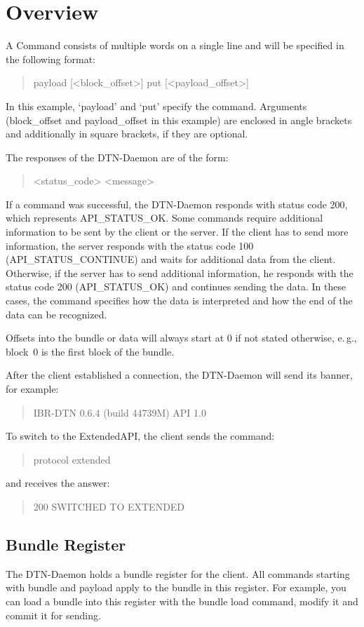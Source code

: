 \documentclass[12pt, a4paper]{scrartcl}
\begin{document}

\section{Overview}
A Command consists of multiple words on a single line and will be specified in the following format:
\begin{quote}
	payload [<block\_offset>] put [<payload\_offset>]
\end{quote}
In this example, `payload' and `put' specify the command.
Arguments (block\_offset and payload\_offset in this example) are enclosed in angle brackets and additionally in square brackets, if they are optional.

The responses of the DTN-Daemon are of the form:
\begin{quote}
	<status\_code> <message>
\end{quote}

If a command was successful, the DTN-Daemon responds with status code 200, which represents API\_STATUS\_OK.
Some commands require additional information to be sent by the client or the server.
If the client has to send more information, the server responds with the status code 100 (API\_STATUS\_CONTINUE) and waits for additional data from the client.
Otherwise, if the server has to send additional information, he responds with the status code 200 (API\_STATUS\_OK) and continues sending the data.
In these cases, the command specifies how the data is interpreted and how the end of the data can be recognized.

Offsets into the bundle or data will always start at 0 if not stated otherwise, e.\,g., block~0 is the first block of the bundle.

After the client established a connection, the DTN-Daemon will send its banner, for example:
\begin{quote}
IBR-DTN 0.6.4 (build 44739M) API 1.0
\end{quote}
To switch to the ExtendedAPI, the client sends the command:
\begin{quote}
	protocol extended
\end{quote}
and receives the answer:
\begin{quote}
	200 SWITCHED TO EXTENDED
\end{quote}

\subsection{Bundle Register}
The DTN-Daemon holds a bundle register for the client.
All commands starting with bundle and payload apply to the bundle in this register.
For example, you can load a bundle into this register with the bundle load command, modify it and commit it for sending.
\end{document}

